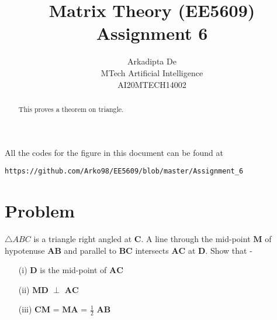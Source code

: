 \documentclass[journal,12pt,twocolumn]{IEEEtran}
\begin{document}
\makeatletter
{}
\makeatother
\let\StandardTheFigure\thefigure
\let\vec\mathbf
\renewcommand{\thefigure}{\theproblem}
\def\putbox#1#2#3{\makebox[0in][l]{\makebox[#1][l]{}\raisebox{\baselineskip}[0in][0in]{\raisebox{#2}[0in][0in]{#3}}}}
     \def\rightbox#1{\makebox[0in][r]{#1}}
     \def\centbox#1{\makebox[0in]{#1}}
     \def\topbox#1{\raisebox{-\baselineskip}[0in][0in]{#1}}
     \def\midbox#1{\raisebox{-0.5\baselineskip}[0in][0in]{#1}}
\vspace{3cm}
\title{Matrix Theory (EE5609) Assignment 6}
\author{Arkadipta De\\MTech Artificial Intelligence\\AI20MTECH14002}

\maketitle
\newpage
\bigskip
\renewcommand{\thefigure}{\theenumi}
\renewcommand{\thetable}{\theenumi}

\begin{abstract}
This proves a theorem on triangle.
\end{abstract}

All the codes for the figure in this document can be found at
\begin{lstlisting}
https://github.com/Arko98/EE5609/blob/master/Assignment_6
\end{lstlisting}

\section{Problem}
$\triangle{ABC}$ is a triangle right angled at $\vec{C}$. A line through the mid-point $\vec{M}$ of hypotenuse $\vec{AB}$ and parallel to $\vec{BC}$ intersects $\vec{AC}$ at $\vec{D}$. Show that -
\begin{itemize}
\item[(i)] $\vec{D}$ is the mid-point of $\vec{AC}$ 
\item[(ii)] $\vec{MD}$ $\perp$ $\vec{AC}$   
\item[(iii)] $\vec{CM}$ = $\vec{MA}$ = $\frac{1}{2}$ $\vec{AB}$
\end{itemize}
\end{document}
